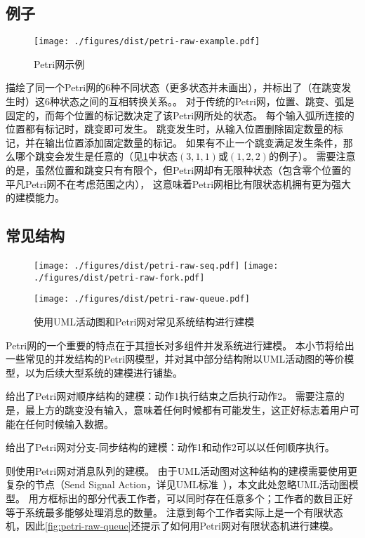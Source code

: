 \documentclass[index]{subfiles}
\begin{document}
\subsection{例子}
\begin{figure}[h]
  \centering
  \texttt{[image: ./figures/dist/petri-raw-example.pdf]}
  \caption{Petri网示例\label{fig:petri-raw}}
\end{figure}
描绘了同一个Petri网的6种不同状态（更多状态并未画出），并标出了（在跳变发生时）这6种状态之间的互相转换关系。。
对于传统的Petri网，位置、跳变、弧是固定的，而每个位置的标记数决定了该Petri网所处的状态。
每个输入弧所连接的位置都有标记时，跳变即可发生。
跳变发生时，从输入位置删除固定数量的标记，并在输出位置添加固定数量的标记。
如果有不止一个跳变满足发生条件，那么哪个跳变会发生是任意的（见\cref{fig:petri-raw}中状态$(3,1,1)$或$(1,2,2)$的例子）。
需要注意的是，虽然位置和跳变只有有限个，但Petri网却有无限种状态（包含零个位置的平凡Petri网不在考虑范围之内），
这意味着Petri网相比有限状态机拥有更为强大的建模能力。

\subsection{常见结构}
\begin{figure}[h]
  \centering%
    {\texttt{[image: ./figures/dist/petri-raw-seq.pdf]}}
  \hspace{1em}
    {\texttt{[image: ./figures/dist/petri-raw-fork.pdf]}}\par
    {\texttt{[image: ./figures/dist/petri-raw-queue.pdf]}}
  \caption{使用UML活动图和Petri网对常见系统结构进行建模}
\end{figure}
Petri网的一个重要的特点在于其擅长对多组件并发系统进行建模。
本小节将给出一些常见的并发结构的Petri网模型，并对其中部分结构附以UML活动图的等价模型，以为后续大型系统的建模进行铺垫。

给出了Petri网对顺序结构的建模：动作1执行结束之后执行动作2。
需要注意的是，最上方的跳变没有输入，意味着任何时候都有可能发生，这正好标志着用户可能在任何时候输入数据。

给出了Petri网对分支-同步结构的建模：动作1和动作2可以以任何顺序执行。

则使用Petri网对消息队列的建模。
由于UML活动图对这种结构的建模需要使用更复杂的节点（Send Signal Action，详见UML标准~），本文此处忽略UML活动图模型。
用方框标出的部分代表工作者，可以同时存在任意多个；工作者的数目正好等于系统最多能够处理消息的数量。
注意到每个工作者实际上是一个有限状态机，因此\cref{fig:petri-raw-queue}还提示了如何用Petri网对有限状态机进行建模。
\end{document}
